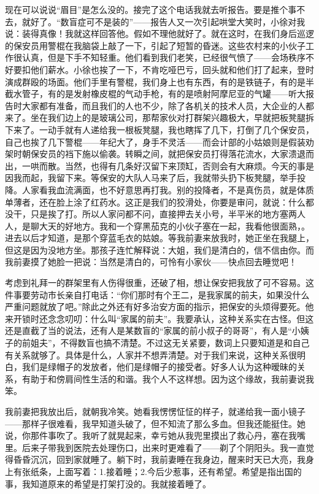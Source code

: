 现在可以说说“眉目”是怎么没的。接完了这个电话我就去听报告。要是推个事不去，就好了。“数盲症可不是装的”——报告人又一次引起哄堂大笑时，小徐对我说：装得真像！我就这样回答他。假如不理他就好了。就在这时，在我们身后巡逻的保安员用警棍在我脑袋上敲了一下，引起了短暂的昏迷。这些农村来的小伙子工作很认真，但是下手不知轻重。他们看到我们老笑，已经很气愤了——会场秩序不好要扣他们薪水。小徐也挨了一下，不肯吃哑巴亏，回头就和他们打了起来，登时演成群殴的场面。他们手里有警棍，我们身上也有东西，有的是铁链子，有的是半截水管子，有的是发射橡皮棍的气动手枪，有的是喷射阿摩尼亚的气罐——听大报告时大家都有准备，而且我们的人也不少，除了各机关的技术人员，大企业的人都来了。坐在我们边上的是玻璃公司，那帮家伙对打群架兴趣极大，早就把板凳腿拆下来了。一动手就有人递给我一根板凳腿，我也瞎挥了几下，打倒了几个保安员，自己也挨了几下警棍——年纪大了，身手不灵活——而会计部的小姑娘则是假装劝架时朝保安员的裆下施以偷袭。转瞬之间，就把保安员打得落花流水，大家溃退而出，一哄而散。当然，也得有几条好汉留下来顶缸，否则会有大麻烦。今天的事是因我而起，我留下来。等保安的大队人马来了后，我就带头扔下板凳腿，举手投降。人家看我血流满面，也不好意思再打我。别的投降者，不是真伤员，就是体质单薄者，还在脸上涂了红药水。这正是我们的狡滑处，你要是审问，就说：什么都没干，只是挨了打。所以人家问都不问，直接押去关小号，半平米的地方塞两人人，是聊大天的好地方。我和一个穿黑茄克的小伙子塞在一起，我看他很面熟，。进去以后才知道，是那个穿蓝毛衣的姑娘。等我前妻来放我时，她正坐在我腿上，但这是因为没地方坐。那孩子连忙解释说：大姐，我们是清白的，信不信由你。而我前妻摸了她脸一把说：当然是清白的，可怜有小家伙——快点回去睡觉吧！ 

考虑到礼拜一的群架里有人伤得很重，还破了相，想让保安把我放了可不容易。这件事要劳动市长亲自打电话：“你们那时有个王二，是我家属的前夫，如果没什么严重问题就放了吧。”除此之外还有好多治安方面的指示，把保安的头烦得要死。他来开锁时还念念叨叨：什么叫“家属的前夫”。我要承认，这种关系实在古怪。但这还是直截了当的说法，还有人是某数盲的“家属的前小叔子的哥哥”，有人是“小姨子的前姐夫”，不得数盲也搞不清楚。不过这无关紧要，数词上只要知道是和自己有关系就够了。具体是什么，人家并不想弄清楚。对于我们来说，这种关系很明白，我们是绿帽子的发放者，他们是绿帽子的接受者。好多人认为这种暧昧的关系，有助于和傍肩间性生活的和谐。我个人不这样想。因为这个缘故，我前妻说我笨。 

我前妻把我放出后，就朝我冷笑。她看我愣愣怔怔的样子，就递给我一面小镜子——那样子很难看，我早知道头破了，但不知流了那么多血。但我还能挺住。她说，你那件事吹了。我听了就晃起来，幸亏她从我兜里摸出了救心丹，塞在我嘴里。后来子带我到医院去处理伤口，出来时更难看了——剃了个阴阳头。我一直觉得昏昏沉沉，回到家就睡了。躺下时，我前妻睡在我身边，醒来时天已大亮，我身上有张纸条，上面写着：1.接着睡；2.今后少惹事，还有希望。希望是指出国的事，我知道原来的希望是打架打没的。我就接着睡了。 



